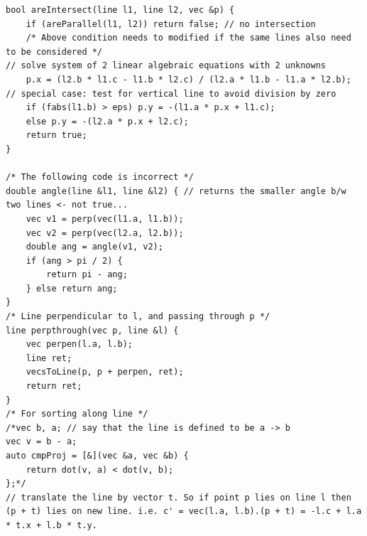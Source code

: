 \documentclass[8pt, a4paper, oneside, twocolumn]{extarticle}
\begin{document}
\begin{verbatim}
bool areIntersect(line l1, line l2, vec &p) {
    if (areParallel(l1, l2)) return false; // no intersection
    /* Above condition needs to modified if the same lines also need to be considered */
// solve system of 2 linear algebraic equations with 2 unknowns
    p.x = (l2.b * l1.c - l1.b * l2.c) / (l2.a * l1.b - l1.a * l2.b);
// special case: test for vertical line to avoid division by zero
    if (fabs(l1.b) > eps) p.y = -(l1.a * p.x + l1.c);
    else p.y = -(l2.a * p.x + l2.c);
    return true;
}

/* The following code is incorrect */
double angle(line &l1, line &l2) { // returns the smaller angle b/w two lines <- not true...
    vec v1 = perp(vec(l1.a, l1.b));
    vec v2 = perp(vec(l2.a, l2.b));
    double ang = angle(v1, v2);
    if (ang > pi / 2) {
        return pi - ang;
    } else return ang;
}
/* Line perpendicular to l, and passing through p */
line perpthrough(vec p, line &l) {
    vec perpen(l.a, l.b);
    line ret;
    vecsToLine(p, p + perpen, ret);
    return ret;
}
/* For sorting along line */
/*vec b, a; // say that the line is defined to be a -> b
vec v = b - a;
auto cmpProj = [&](vec &a, vec &b) {
    return dot(v, a) < dot(v, b);
};*/
// translate the line by vector t. So if point p lies on line l then (p + t) lies on new line. i.e. c' = vec(l.a, l.b).(p + t) = -l.c + l.a * t.x + l.b * t.y.


\end{verbatim}
\end{document}
